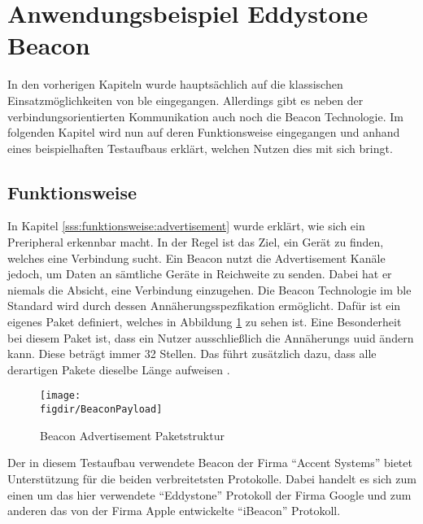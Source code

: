 \section{Anwendungsbeispiel Eddystone Beacon}
\label{s:ibeacon}

In den vorherigen Kapiteln wurde hauptsächlich auf die klassischen Einsatzmöglichkeiten von \ac{ble} eingegangen. Allerdings gibt es neben der verbindungsorientierten Kommunikation auch noch die Beacon Technologie. Im folgenden Kapitel wird nun auf deren Funktionsweise eingegangen und anhand eines beispielhaften Testaufbaus erklärt, welchen Nutzen dies mit sich bringt.\\   

\subsection{Funktionsweise}
\label{ss:ibeacon:funktionsweise}

In Kapitel \ref{sss:funktionsweise:advertisement} wurde erklärt, wie sich ein Preripheral erkennbar macht. In der Regel ist das Ziel, ein Gerät zu finden, welches eine Verbindung sucht. Ein Beacon nutzt die Advertisement Kanäle jedoch, um Daten an sämtliche Geräte in Reichweite zu senden. Dabei hat er niemals die Absicht, eine Verbindung einzugehen. Die Beacon Technologie im \ac{ble} Standard wird durch dessen Annäherungsspezfikation ermöglicht. Dafür ist ein eigenes Paket definiert, welches in Abbildung \ref{FIG:beaconPayload} zu sehen ist. Eine Besonderheit bei diesem Paket ist, dass ein Nutzer ausschließlich die Annäherungs \ac{uuid} ändern kann. Diese beträgt immer 32 Stellen. Das führt zusätzlich dazu, dass alle derartigen Pakete dieselbe Länge aufweisen \cite[Seite 16]{Gast14:BPA}.\\

\begin{figure}[h]
	\centering
	\texttt{[image: \\figdir/BeaconPayload]}
	\caption{Beacon Advertisement Paketstruktur \cite[Seite 16]{Gast14:BPA}}
	\label{FIG:beaconPayload}
\end{figure}

\noindent Der in diesem Testaufbau verwendete Beacon der Firma "`Accent Systems"' bietet Unterstützung für die beiden verbreitetsten Protokolle. Dabei handelt es sich zum einen um das hier verwendete "`Eddystone"' Protokoll der Firma Google und zum anderen das von der Firma Apple entwickelte "`iBeacon"' Protokoll.\\ 

